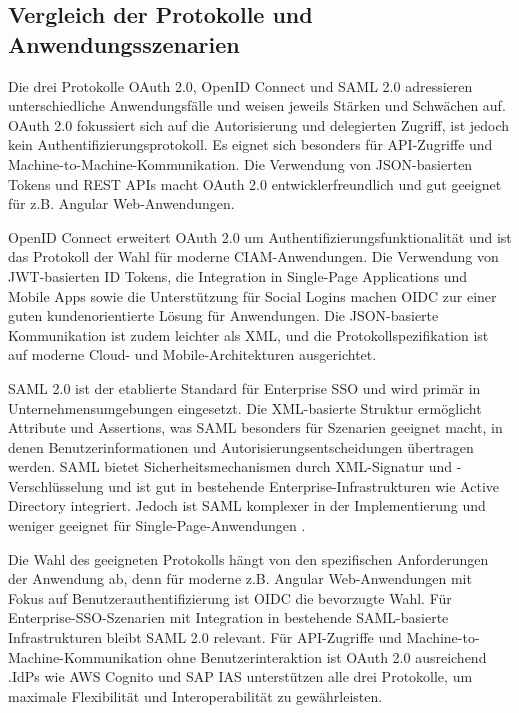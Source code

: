 \subsection{Vergleich der Protokolle und Anwendungsszenarien}

Die drei Protokolle OAuth 2.0, OpenID Connect und \ac{SAML} 2.0 adressieren unterschiedliche Anwendungsfälle und weisen jeweils Stärken und Schwächen auf. OAuth 2.0 fokussiert sich auf die Autorisierung und delegierten Zugriff, ist jedoch kein Authentifizierungsprotokoll. Es eignet sich besonders für API-Zugriffe und Machine-to-Machine-Kommunikation. Die Verwendung von JSON-basierten Tokens und \ac{REST} APIs macht OAuth 2.0 entwicklerfreundlich und gut geeignet für z.B. Angular Web-Anwendungen.

OpenID Connect erweitert OAuth 2.0 um Authentifizierungsfunktionalität und ist das Protokoll der Wahl für moderne \ac{CIAM}-Anwendungen. Die Verwendung von \ac{JWT}-basierten ID Tokens, die Integration in Single-Page Applications und Mobile Apps sowie die Unterstützung für Social Logins machen \ac{OIDC} zur einer guten kundenorientierte Lösung für Anwendungen. Die JSON-basierte Kommunikation ist zudem leichter als XML, und die Protokollspezifikation ist auf moderne Cloud- und Mobile-Architekturen ausgerichtet.

\ac{SAML} 2.0 ist der etablierte Standard für Enterprise \ac{SSO} und wird primär in Unternehmensumgebungen eingesetzt. Die XML-basierte Struktur ermöglicht Attribute und Assertions, was \ac{SAML} besonders für Szenarien geeignet macht, in denen Benutzerinformationen und Autorisierungsentscheidungen übertragen werden. \ac{SAML} bietet Sicherheitsmechanismen durch XML-Signatur und -Verschlüsselung und ist gut in bestehende Enterprise-Infrastrukturen wie Active Directory integriert. Jedoch ist \ac{SAML} komplexer in der Implementierung und weniger geeignet für Single-Page-Anwendungen \citep{Zhuravel2024}.

Die Wahl des geeigneten Protokolls hängt von den spezifischen Anforderungen der Anwendung ab, denn für moderne z.B. Angular Web-Anwendungen mit Fokus auf Benutzerauthentifizierung ist \ac{OIDC} die bevorzugte Wahl. Für Enterprise-SSO-Szenarien mit Integration in bestehende \ac{SAML}-basierte Infrastrukturen bleibt \ac{SAML} 2.0 relevant. Für API-Zugriffe und Machine-to-Machine-Kommunikation ohne Benutzerinteraktion ist OAuth 2.0 ausreichend \citep{Zhuravel2024}.\ac{IdP}s wie AWS Cognito und \ac{SAP IAS} unterstützen alle drei Protokolle, um maximale Flexibilität und Interoperabilität zu gewährleisten.


